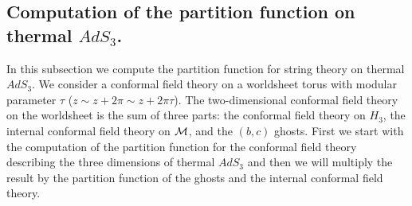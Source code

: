 \subsection{Computation of the partition function on thermal $AdS_3$.}
 
In this subsection we compute the  partition function for string theory 
on thermal $AdS_3$. We consider a conformal field theory on a worldsheet 
torus with modular parameter $\tau$ ($z \sim z + 2\pi \sim z + 2 \pi \tau$). 
The two-dimensional conformal field theory on the worldsheet is the sum
of three parts: the conformal field theory on $H_3$, the internal conformal
field
theory on ${\cal M}$, and the $(b,c)$ ghosts. 
First we start with the computation of the partition function for the
conformal field theory describing the three dimensions of thermal $AdS_3$ 
and then we will multiply the result by the partition
function of the ghosts and the internal conformal field theory. 

